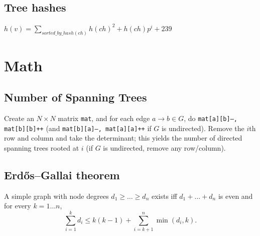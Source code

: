 	\subsection{Tree hashes}
		$h(v) = \sum_{sorted\_by\_hash(ch)} h(ch)^2 + h(ch)p^i + 239$

\section{Math}
	\subsection{Number of Spanning Trees}
		Create an $N\times N$ matrix \texttt{mat}, and for each edge $a \rightarrow b \in G$, do
		\texttt{mat[a][b]--, mat[b][b]++} (and \texttt{mat[b][a]--, mat[a][a]++} if $G$ is undirected).
		Remove the $i$th row and column and take the determinant; this yields the number of directed spanning trees rooted at $i$
		(if $G$ is undirected, remove any row/column).

	\subsection{Erdős–Gallai theorem}
		A simple graph with node degrees $d_1 \ge \dots \ge d_n$ exists iff $d_1 + \dots + d_n$ is even and for every $k = 1\dots n$,
		\[ \sum _{i=1}^{k}d_{i}\leq k(k-1)+\sum _{i=k+1}^{n}\min(d_{i},k). \]
